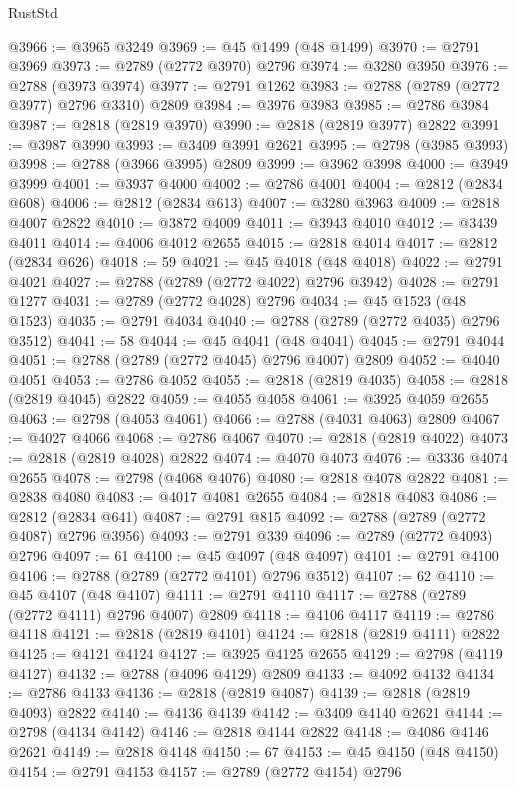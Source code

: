 \begin{lexlean}{RustStd}
\begin{coremodule}
@3966 := @3965 @3249
@3969 := @45 @1499 (@48 @1499)
@3970 := @2791 @3969
@3973 := @2789 (@2772 @3970) @2796
@3974 := @3280 @3950
@3976 := @2788 (@3973 @3974)
@3977 := @2791 @1262
@3983 := @2788 (@2789 (@2772 @3977) @2796 @3310) @2809
@3984 := @3976 @3983
@3985 := @2786 @3984
@3987 := @2818 (@2819 @3970)
@3990 := @2818 (@2819 @3977) @2822
@3991 := @3987 @3990
@3993 := @3409 @3991 @2621
@3995 := @2798 (@3985 @3993)
@3998 := @2788 (@3966 @3995) @2809
@3999 := @3962 @3998
@4000 := @3949 @3999
@4001 := @3937 @4000
@4002 := @2786 @4001
@4004 := @2812 (@2834 @608)
@4006 := @2812 (@2834 @613)
@4007 := @3280 @3963
@4009 := @2818 @4007 @2822
@4010 := @3872 @4009
@4011 := @3943 @4010
@4012 := @3439 @4011
@4014 := @4006 @4012 @2655
@4015 := @2818 @4014
@4017 := @2812 (@2834 @626)
@4018 := 59
@4021 := @45 @4018 (@48 @4018)
@4022 := @2791 @4021
@4027 := @2788 (@2789 (@2772 @4022) @2796 @3942)
@4028 := @2791 @1277
@4031 := @2789 (@2772 @4028) @2796
@4034 := @45 @1523 (@48 @1523)
@4035 := @2791 @4034
@4040 := @2788 (@2789 (@2772 @4035) @2796 @3512)
@4041 := 58
@4044 := @45 @4041 (@48 @4041)
@4045 := @2791 @4044
@4051 := @2788 (@2789 (@2772 @4045) @2796 @4007) @2809
@4052 := @4040 @4051
@4053 := @2786 @4052
@4055 := @2818 (@2819 @4035)
@4058 := @2818 (@2819 @4045) @2822
@4059 := @4055 @4058
@4061 := @3925 @4059 @2655
@4063 := @2798 (@4053 @4061)
@4066 := @2788 (@4031 @4063) @2809
@4067 := @4027 @4066
@4068 := @2786 @4067
@4070 := @2818 (@2819 @4022)
@4073 := @2818 (@2819 @4028) @2822
@4074 := @4070 @4073
@4076 := @3336 @4074 @2655
@4078 := @2798 (@4068 @4076)
@4080 := @2818 @4078 @2822
@4081 := @2838 @4080
@4083 := @4017 @4081 @2655
@4084 := @2818 @4083
@4086 := @2812 (@2834 @641)
@4087 := @2791 @815
@4092 := @2788 (@2789 (@2772 @4087) @2796 @3956)
@4093 := @2791 @339
@4096 := @2789 (@2772 @4093) @2796
@4097 := 61
@4100 := @45 @4097 (@48 @4097)
@4101 := @2791 @4100
@4106 := @2788 (@2789 (@2772 @4101) @2796 @3512)
@4107 := 62
@4110 := @45 @4107 (@48 @4107)
@4111 := @2791 @4110
@4117 := @2788 (@2789 (@2772 @4111) @2796 @4007) @2809
@4118 := @4106 @4117
@4119 := @2786 @4118
@4121 := @2818 (@2819 @4101)
@4124 := @2818 (@2819 @4111) @2822
@4125 := @4121 @4124
@4127 := @3925 @4125 @2655
@4129 := @2798 (@4119 @4127)
@4132 := @2788 (@4096 @4129) @2809
@4133 := @4092 @4132
@4134 := @2786 @4133
@4136 := @2818 (@2819 @4087)
@4139 := @2818 (@2819 @4093) @2822
@4140 := @4136 @4139
@4142 := @3409 @4140 @2621
@4144 := @2798 (@4134 @4142)
@4146 := @2818 @4144 @2822
@4148 := @4086 @4146 @2621
@4149 := @2818 @4148
@4150 := 67
@4153 := @45 @4150 (@48 @4150)
@4154 := @2791 @4153
@4157 := @2789 (@2772 @4154) @2796

\end{coremodule}
\end{lexlean}
